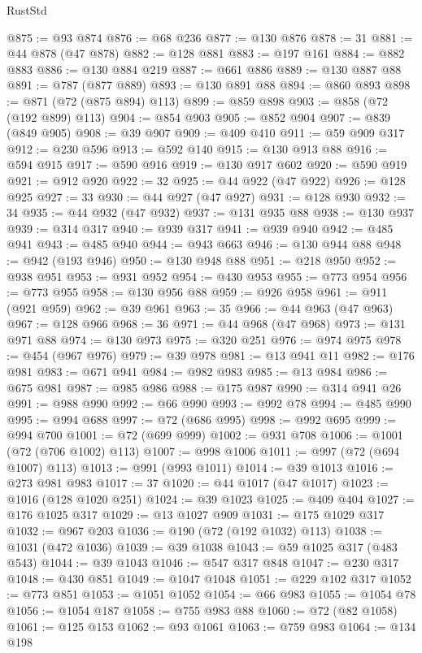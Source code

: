 \begin{lexlean}{RustStd}
\begin{coremodule}
@875 := @93 @874
@876 := @68 @236
@877 := @130 @876
@878 := 31
@881 := @44 @878 (@47 @878)
@882 := @128 @881
@883 := @197 @161
@884 := @882 @883
@886 := @130 @884 @219
@887 := @661 @886
@889 := @130 @887 @88
@891 := @787 (@877 @889)
@893 := @130 @891 @88
@894 := @860 @893
@898 := @871 (@72 (@875 @894) @113)
@899 := @859 @898
@903 := @858 (@72 (@192 @899) @113)
@904 := @854 @903
@905 := @852 @904
@907 := @839 (@849 @905)
@908 := @39 @907
@909 := @409 @410
@911 := @59 @909 @317
@912 := @230 @596
@913 := @592 @140
@915 := @130 @913 @88
@916 := @594 @915
@917 := @590 @916
@919 := @130 @917 @602
@920 := @590 @919
@921 := @912 @920
@922 := 32
@925 := @44 @922 (@47 @922)
@926 := @128 @925
@927 := 33
@930 := @44 @927 (@47 @927)
@931 := @128 @930
@932 := 34
@935 := @44 @932 (@47 @932)
@937 := @131 @935 @88
@938 := @130 @937
@939 := @314 @317
@940 := @939 @317
@941 := @939 @940
@942 := @485 @941
@943 := @485 @940
@944 := @943 @663
@946 := @130 @944 @88
@948 := @942 (@193 @946)
@950 := @130 @948 @88
@951 := @218 @950
@952 := @938 @951
@953 := @931 @952
@954 := @430 @953
@955 := @773 @954
@956 := @773 @955
@958 := @130 @956 @88
@959 := @926 @958
@961 := @911 (@921 @959)
@962 := @39 @961
@963 := 35
@966 := @44 @963 (@47 @963)
@967 := @128 @966
@968 := 36
@971 := @44 @968 (@47 @968)
@973 := @131 @971 @88
@974 := @130 @973
@975 := @320 @251
@976 := @974 @975
@978 := @454 (@967 @976)
@979 := @39 @978
@981 := @13 @941 @11
@982 := @176 @981
@983 := @671 @941
@984 := @982 @983
@985 := @13 @984
@986 := @675 @981
@987 := @985 @986
@988 := @175 @987
@990 := @314 @941 @26
@991 := @988 @990
@992 := @66 @990
@993 := @992 @78
@994 := @485 @990
@995 := @994 @688
@997 := @72 (@686 @995)
@998 := @992 @695
@999 := @994 @700
@1001 := @72 (@699 @999)
@1002 := @931 @708
@1006 := @1001 (@72 (@706 @1002) @113)
@1007 := @998 @1006
@1011 := @997 (@72 (@694 @1007) @113)
@1013 := @991 (@993 @1011)
@1014 := @39 @1013
@1016 := @273 @981 @983
@1017 := 37
@1020 := @44 @1017 (@47 @1017)
@1023 := @1016 (@128 @1020 @251)
@1024 := @39 @1023
@1025 := @409 @404
@1027 := @176 @1025 @317
@1029 := @13 @1027 @909
@1031 := @175 @1029 @317
@1032 := @967 @203
@1036 := @190 (@72 (@192 @1032) @113)
@1038 := @1031 (@472 @1036)
@1039 := @39 @1038
@1043 := @59 @1025 @317 (@483 @543)
@1044 := @39 @1043
@1046 := @547 @317 @848
@1047 := @230 @317
@1048 := @430 @851
@1049 := @1047 @1048
@1051 := @229 @102 @317
@1052 := @773 @851
@1053 := @1051 @1052
@1054 := @66 @983
@1055 := @1054 @78
@1056 := @1054 @187
@1058 := @755 @983 @88
@1060 := @72 (@82 @1058)
@1061 := @125 @153
@1062 := @93 @1061
@1063 := @759 @983
@1064 := @134 @198

\end{coremodule}
\end{lexlean}

